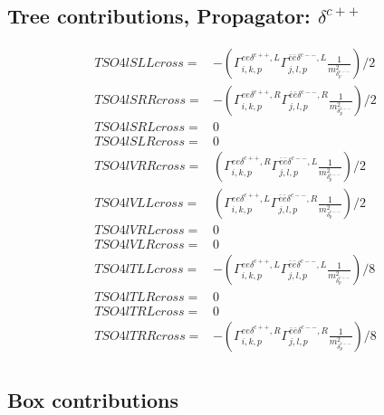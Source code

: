 \documentclass[A4,landscape]{article}
\begin{document}
\subsection{Tree contributions, Propagator: $\delta^{c++}$} 

\begin{align} 
  TSO4lSLLcross= & -(\Gamma^{e e \delta^{c++},L}_{i, k, p} \Gamma^{\bar{e}\bar{e}\delta^{c--} ,L}_{j, l, p} \frac{1}{m^2_{\delta^{c--}_{{p}}}})/2 \\ 
  TSO4lSRRcross= & -(\Gamma^{e e \delta^{c++},R}_{i, k, p} \Gamma^{\bar{e}\bar{e}\delta^{c--} ,R}_{j, l, p} \frac{1}{m^2_{\delta^{c--}_{{p}}}})/2 \\ 
  TSO4lSRLcross= & 0 \\ 
  TSO4lSLRcross= & 0 \\ 
  TSO4lVRRcross= & (\Gamma^{e e \delta^{c++},R}_{i, k, p} \Gamma^{\bar{e}\bar{e}\delta^{c--} ,L}_{j, l, p} \frac{1}{m^2_{\delta^{c--}_{{p}}}})/2 \\ 
  TSO4lVLLcross= & (\Gamma^{e e \delta^{c++},L}_{i, k, p} \Gamma^{\bar{e}\bar{e}\delta^{c--} ,R}_{j, l, p} \frac{1}{m^2_{\delta^{c--}_{{p}}}})/2 \\ 
  TSO4lVRLcross= & 0 \\ 
  TSO4lVLRcross= & 0 \\ 
  TSO4lTLLcross= & -(\Gamma^{e e \delta^{c++},L}_{i, k, p} \Gamma^{\bar{e}\bar{e}\delta^{c--} ,L}_{j, l, p} \frac{1}{m^2_{\delta^{c--}_{{p}}}})/8 \\ 
  TSO4lTLRcross= & 0 \\ 
  TSO4lTRLcross= & 0 \\ 
  TSO4lTRRcross= & -(\Gamma^{e e \delta^{c++},R}_{i, k, p} \Gamma^{\bar{e}\bar{e}\delta^{c--} ,R}_{j, l, p} \frac{1}{m^2_{\delta^{c--}_{{p}}}})/8 \\ 
\end{align} 
\subsection{Box contributions} 
\end{document}
